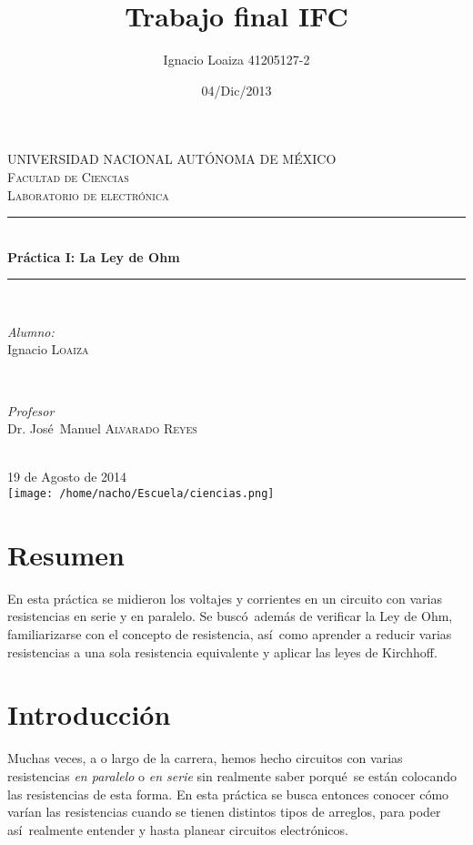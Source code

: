 \documentclass{article}
\title{Trabajo final IFC}
\author{Ignacio Loaiza   41205127-2}
\date{04/Dic/2013}
\begin{document}
\begin{titlepage}

\newcommand{\HRule}{\rule{\linewidth}{0.5mm}}
\center 
 
\textsc{\LARGE UNIVERSIDAD NACIONAL AUT\'ONOMA DE M\'EXICO}\\[1.5cm] 
\textsc{\Large Facultad de Ciencias}\\[0.5cm] 
\textsc{\large Laboratorio de electr\'onica}\\[0.5cm] 
\HRule \\[0.4cm]
{ \huge \bfseries Pr\'actica I: La Ley de Ohm}\\[0.4cm]
\HRule \\[1.5cm]
\begin{minipage}{0.4\textwidth}
\begin{flushleft} \large
\emph{Alumno:}\\
Ignacio \textsc{Loaiza}
\end{flushleft}
\end{minipage}
~
\begin{minipage}{0.4\textwidth}
\begin{flushright} \large
\emph{Profesor} \\
Dr. Jos\'e\ Manuel \textsc{Alvarado Reyes}
\end{flushright}
\end{minipage}\\[3cm]
{\large 19 de Agosto de 2014}\\[0.5cm]
\texttt{[image: /home/nacho/Escuela/ciencias.png]}\\[1cm]
\vfill
\end{titlepage}
\section{Resumen}
En esta pr\'actica se midieron los voltajes y corrientes en un circuito con varias resistencias en serie y en paralelo. Se busc\'o\, adem\'as de verificar la Ley de Ohm, familiarizarse con el concepto de resistencia, as\'i\ como aprender a reducir varias resistencias a una sola resistencia equivalente y aplicar las leyes de Kirchhoff.

\section{Introducci\'on}
Muchas veces, a o largo de la carrera, hemos hecho circuitos con varias resistencias \textit{en paralelo} o \textit{en serie} sin realmente saber porqu\'e\ se est\'an colocando las resistencias de esta forma. En esta pr\'actica se busca entonces conocer c\'omo var\'ian las resistencias cuando se tienen distintos tipos de arreglos, para poder as\'i\ realmente entender y hasta planear circuitos electr\'onicos.
\end{document}
